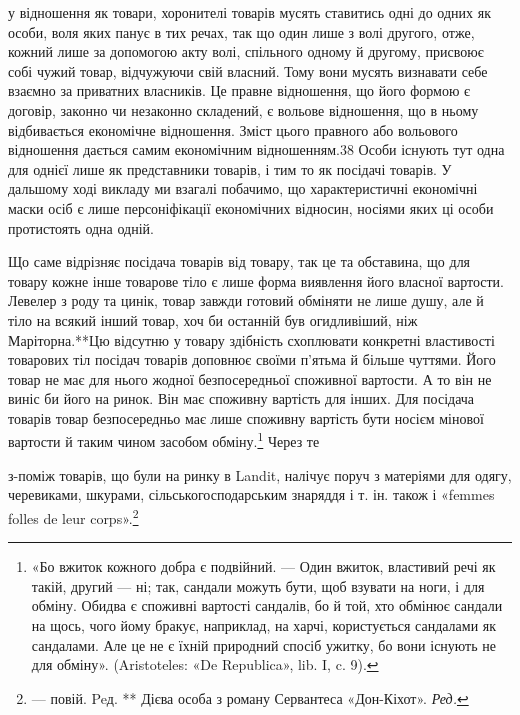 у відношення як товари, хоронителі товарів мусять ставитись
одні до одних як особи, воля яких панує в тих речах, так що один
лише з волі другого, отже, кожний лише за допомогою акту волі,
спільного одному й другому, присвоює собі чужий товар, відчужуючи
свій власний. Тому вони мусять визнавати себе взаємно
за приватних власників. Це правне відношення, що його формою
є договір, законно чи незаконно складений, є вольове відношення,
що в ньому відбивається економічне відношення. Зміст цього
правного або вольового відношення дається самим економічним
відношенням.38 Особи існують тут одна для однієї лише як представники
товарів, і тим то як посідачі товарів. У дальшому ході
викладу ми взагалі побачимо, що характеристичні економічні
маски осіб є лише персоніфікації економічних відносин, носіями
яких ці особи протистоять одна одній.

Що саме відрізняє посідача товарів від товару, так це та обставина,
що для товару кожне інше товарове тіло є лише форма виявлення
його власної вартости. Левелер з роду та цинік, товар
завжди готовий обміняти не лише душу, але й тіло на всякий
інший товар, хоч би останній був огидливіший, ніж Маріторна.**Цю
відсутню у товару здібність схоплювати конкретні
властивості товарових тіл посідач товарів доповнює своїми п’ятьма
й більше чуттями. Його товар не має для нього жодної безпосередньої
споживної вартости. А то він не виніс би його на ринок.
Він має споживну вартість для інших. Для посідача товарів
товар безпосередньо має лише споживну вартість бути носієм
мінової вартости й таким чином засобом обміну.\footnote{
«Бо вжиток кожного добра є подвійний. — Один вжиток, властивий
речі як такій, другий — ні; так, сандали можуть бути, щоб взувати
на ноги, і для обміну. Обидва є споживні вартості сандалів, бо й той, хто
обмінює сандали на щось, чого йому бракує, наприклад, на харчі, користується
сандалами як сандалами. Але це не є їхній природний спосіб
ужитку, бо вони існують не для обміну». (Aristoteles: «De Republica»,
lib. I, c. 9).
} Через те

з-поміж товарів, що були на ринку в Landit, налічує поруч з матеріями
для одягу, черевиками, шкурами, сільськогосподарським знаряддя і т. ін.
також і «femmes folles de leur corps».\footnote*{
— повій. Peд.
** Дієва особа з роману Сервантеса «Дон-Кіхот». \emph{Ред.}
}

